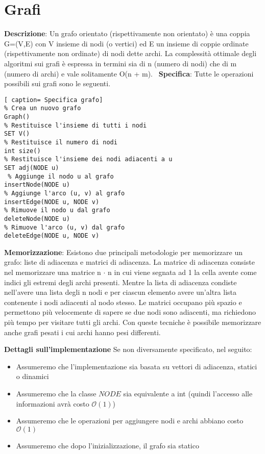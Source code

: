 \documentclass[../cheatSheetAlgoritmi.tex]{subfiles}
\begin{document}
\chapter{Grafi}
\textbf{Descrizione}: Un grafo orientato (rispettivamente non orientato) è una coppia G=(V,E) con V insieme di nodi (o vertici) ed E un insieme di coppie ordinate (rispettivamente non ordinate) di nodi dette archi. La complessità ottimale degli algoritmi sui grafi è espressa in termini sia di n (numero di nodi) che di m (numero di archi) e vale solitamente O(n + m). \
\textbf{Specifica}: Tutte le operazioni possibili sui grafi sono le seguenti. 
\begin{lstlisting}[ caption= Specifica grafo]
% Crea un nuovo grafo
Graph()
% Restituisce l'insieme di tutti i nodi		
SET V()	
% Restituisce il numero di nodi	
int size()
% Restituisce l'insieme dei nodi adiacenti a u
SET adj(NODE u)
 % Aggiunge il nodo u al grafo
insertNode(NODE u)
% Aggiunge l'arco (u, v) al grafo
insertEdge(NODE u, NODE v)
% Rimuove il nodo u dal grafo
deleteNode(NODE u)	
% Rimuove l'arco (u, v) dal grafo
deleteEdge(NODE u, NODE v)	
\end{lstlisting}
\textbf{Memorizzazione}: Esistono due principali metodologie per memorizzare un grafo: liste di adiacenza e matrici di adiacenza. La matrice di adiacenza consiste nel memorizzare una matrice n $\cdot$ n in cui viene segnata ad 1 la cella avente come indici gli estremi degli archi presenti. Mentre la lista di adiacenza condiste nell'avere una lista degli n nodi e per ciascun elemento avere un'altra lista contenente i nodi adiacenti al nodo stesso. Le matrici occupano più spazio e permettono più velocemente di sapere se due nodi sono adiacenti, ma richiedono più tempo per visitare tutti gli archi. Con queste tecniche è possibile memorizzare anche grafi pesati i cui archi hanno pesi differenti. \

\textbf{Dettagli sull’implementazione}
Se non diversamente specificato, nel seguito:
\begin{itemize}
	\item Assumeremo che l’implementazione sia basata su vettori di adiacenza, statici o dinamici
	\item Assumeremo che la classe $NODE$ sia equivalente a int (quindi l’accesso alle informazioni avrà costo $\mathcal{O}(1)$)
	\item Assumeremo che le operazioni per aggiungere nodi e archi abbiano costo $\mathcal{O}(1)$
	\item Assumeremo che dopo l’inizializzazione, il grafo sia statico
\end{itemize}
\end{document}
